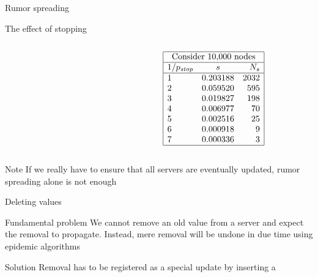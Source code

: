 \begin{slide}{Rumor spreading}
  \begin{block}{The effect of stopping}
    \begin{columns}
      \begin{column}{0.4\textwidth}
      \end{column}
      \begin{column}{0.4\textwidth}
        \newcommand{\pstop}{p_{\mbox{\scriptsize\itshape stop}}}
        \footnotesize
        \[
        \begin{array}{|lcr|} \hline
	      \multicolumn{3}{|c|}{\mbox{Consider 10,000 nodes}} \\ \hline
	      1/\pstop   &   s         & N_s \\ \hline
	      1          &   0.203188  & 2032 \\
	      2          &   0.059520  & 595 \\
	      3          &   0.019827  & 198 \\
	      4          &   0.006977  & 70 \\
	      5          &   0.002516  & 25 \\ 
	      6          &   0.000918  & 9 \\
	      7          &   0.000336  & 3 \\ \hline
	    \end{array}
        \]
      \end{column}
    \end{columns}
  \end{block}
  \onslide
  \begin{alertblock}{Note}
    If we really have to ensure that all servers are eventually updated, rumor spreading alone is not enough
  \end{alertblock}
\end{slide}
\begin{slide}{Deleting values}
  \begin{alertblock}{Fundamental problem} 
    We cannot remove an old value from a server and expect the removal to propagate. Instead, mere removal
    will be undone in due time using epidemic algorithms
  \end{alertblock}
  \begin{block}{Solution} 
    Removal has to be registered as a special update by inserting a 
  \end{block}
\end{slide}
